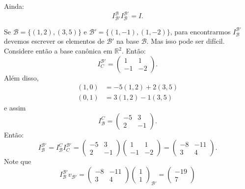 \begin{exemplo*}
\begin{equation*}
    \end{equation*}
    Ainda:
    \begin{equation*}
    	I_{{\mathcal{B}}'}^{\mathcal{B}}I_{\mathcal{B}}^{{\mathcal{B}}'} = I.
    \end{equation*}
\end{exemplo*}

\begin{exemplo*}
	Se ${\mathcal{B}} = \{ (1,2),(3,5)\}$ e ${\mathcal{B}}' = \{(1,-1),(1,-2)\}$, para encontrarmos $I_{\mathcal{B}}^{{\mathcal{B}}'}$ devemos escrever os elementos de ${\mathcal{B}}'$ na base ${\mathcal{B}}$. Mas isso pode ser difícil. Considere então a base canônica em ${\mathbb{R}}^2$. Então:
    \begin{equation*}
    	I_C^{{\mathcal{B}}'} = \begin{pmatrix} 1 & 1\\-1 & -2\end{pmatrix}.
    \end{equation*}
    Além disso,
    \begin{align*}
    	(1,0) &= -5(1,2)+2(3,5)\\
        (0,1) &= 3(1,2)-1(3,5)
    \end{align*}
    e assim
    \begin{equation*}
    	I_{\mathcal{B}}^C = \begin{pmatrix} -5 & 3\\2 & -1\end{pmatrix}.
    \end{equation*}
    Então:
    \begin{equation*}
    	I_{\mathcal{B}}^{{\mathcal{B}}'} = I_{\mathcal{B}}^C I_C^{{\mathcal{B}}'} = \begin{pmatrix} -5 & 3\\2 & -1\end{pmatrix} \begin{pmatrix} 1 & 1\\-1 & -2\end{pmatrix} = \begin{pmatrix} -8 & -11 \\3 & 4\end{pmatrix}.
    \end{equation*}
    Note que
    \begin{equation*}
    	I_{\mathcal{B}}^{{\mathcal{B}}'} v_{{\mathcal{B}}'} = \begin{pmatrix} -8 & -11\\3 & 4\end{pmatrix} \begin{pmatrix} 1\\1\end{pmatrix}_{{\mathcal{B}}'} = \begin{pmatrix} -19\\7\end{pmatrix}

\end{equation*}
\end{exemplo*}
